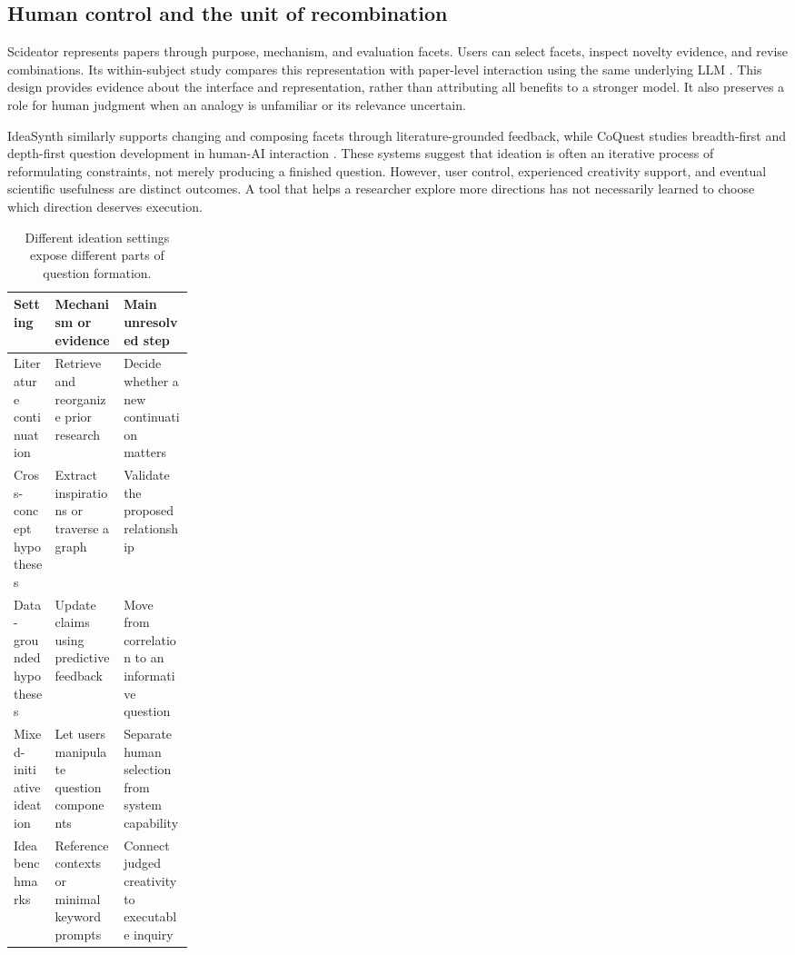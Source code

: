 \subsection{Human control and the unit of recombination}

Scideator represents papers through purpose, mechanism, and evaluation facets. Users can select facets, inspect novelty evidence, and revise combinations. Its within-subject study compares this representation with paper-level interaction using the same underlying LLM \cite{scideator}. This design provides evidence about the interface and representation, rather than attributing all benefits to a stronger model. It also preserves a role for human judgment when an analogy is unfamiliar or its relevance uncertain.

IdeaSynth similarly supports changing and composing facets through literature-grounded feedback, while CoQuest studies breadth-first and depth-first question development in human-AI interaction \cite{ideasynth,coquest}. These systems suggest that ideation is often an iterative process of reformulating constraints, not merely producing a finished question. However, user control, experienced creativity support, and eventual scientific usefulness are distinct outcomes. A tool that helps a researcher explore more directions has not necessarily learned to choose which direction deserves execution.

\begin{table}[t]
\centering
\small
\caption{Different ideation settings expose different parts of question formation.}
\label{tab:question-settings}
\begin{tabularx}{\linewidth}{@{}P{0.23\linewidth}YY@{}}
\toprule
Setting & Mechanism or evidence & Main unresolved step \\
\midrule
Literature continuation \cite{scimon,researchagent,scipip,chain-of-ideas} & Retrieve and reorganize prior research & Decide whether a new continuation matters \\
Cross-concept hypotheses \cite{moose,sciagents} & Extract inspirations or traverse a graph & Validate the proposed relationship \\
Data-grounded hypotheses \cite{hypogenic,hyporefine} & Update claims using predictive feedback & Move from correlation to an informative question \\
Mixed-initiative ideation \cite{scideator,ideasynth,coquest} & Let users manipulate question components & Separate human selection from system capability \\
Idea benchmarks \cite{ideabench,liveideabench} & Reference contexts or minimal keyword prompts & Connect judged creativity to executable inquiry \\
\bottomrule
\end{tabularx}
\end{table}

